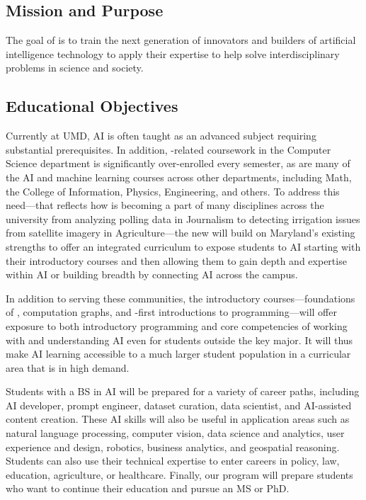 
\subsection{Mission and Purpose}

The goal of \name{} is to train the next generation of innovators and builders of artificial intelligence technology to apply their expertise to help solve interdisciplinary problems in science and society.

\subsection{Educational Objectives}

Currently at UMD, AI is often taught as an advanced subject requiring substantial prerequisites. In addition, \ai{}-related coursework in the Computer Science department is significantly over-enrolled every semester, as are many of the AI and machine learning courses across other departments, including Math, the College of Information, Physics, Engineering, and others. 
%
To address this need---that reflects how \ai{} is becoming a part of many disciplines across the university from analyzing polling data in Journalism to detecting irrigation issues from satellite imagery in Agriculture---the new \short{} will build on Maryland's existing strengths to  offer an integrated curriculum to expose students to AI starting with their introductory courses and then allowing them to gain depth and expertise within AI or building breadth by connecting AI across the campus. 

In addition to serving these communities, the introductory courses---foundations of \ai{}, computation graphs, and \ai{}-first introductions to programming---will offer exposure to both introductory programming and core competencies of working with and understanding AI even for students outside the key major.  It will thus make AI learning accessible to a much larger student population in a curricular area that is in high demand.

Students with a BS in AI will be prepared for a variety of career paths, including AI developer, prompt engineer, dataset curation, data scientist, and AI-assisted content creation.  These AI skills will also be useful in application areas such as natural language processing, computer vision, data science and analytics, user experience and design, robotics, business analytics, and geospatial reasoning. Students can also use their technical expertise to enter careers in policy, law, education, agriculture, or healthcare. Finally, our program will prepare students who want to continue their education and pursue an MS or PhD.



